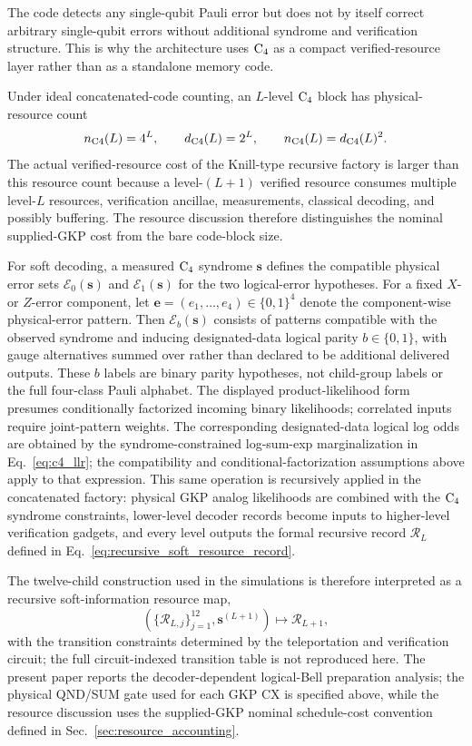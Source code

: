 \documentclass[aps,
prx,
superscriptaddress,
reprint,
longbibliography,
floatfix]{revtex4-2}
\begin{document}
The code detects any single-qubit Pauli error but does not by itself correct arbitrary single-qubit errors without additional syndrome and verification structure. This is why the architecture uses ${\rm C_4}$ as a compact verified-resource layer rather than as a standalone memory code.

Under ideal concatenated-code counting, an $L$-level ${\rm C_4}$ block has physical-resource count
\begin{equation}
 n_{\rm C4}(L)=4^L,
\qquad
 d_{\rm C4}(L)=2^L,
\qquad
 n_{\rm C4}(L)=d_{\rm C4}(L)^2 .
\end{equation}
The actual verified-resource cost of the Knill-type recursive factory is larger than this resource count because a level-$(L+1)$ verified resource consumes multiple level-$L$ resources, verification ancillae, measurements, classical decoding, and possibly buffering. The resource discussion therefore distinguishes the nominal supplied-GKP cost from the bare code-block size.

For soft decoding, a measured ${\rm C_4}$ syndrome $\bm s$ defines the compatible physical error sets $\mathcal E_{0}(\bm s)$ and $\mathcal E_1(\bm s)$ for the two logical-error hypotheses. For a fixed $X$- or $Z$-error component, let $\bm e=(e_1,\ldots,e_4)\in\{0,1\}^4$ denote the component-wise physical-error pattern. Then $\mathcal E_b(\bm s)$ consists of patterns compatible with the observed syndrome and inducing designated-data logical parity $b\in\{0,1\}$, with gauge alternatives summed over rather than declared to be additional delivered outputs. These $b$ labels are binary parity hypotheses, not child-group labels or the full four-class Pauli alphabet. The displayed product-likelihood form presumes conditionally factorized incoming binary likelihoods; correlated inputs require joint-pattern weights. The corresponding designated-data logical log odds are obtained by the syndrome-constrained log-sum-exp marginalization in Eq.~\eqref{eq:c4_llr}; the compatibility and conditional-factorization assumptions above apply to that expression.
This same operation is recursively applied in the concatenated factory: physical GKP analog likelihoods are combined with the ${\rm C_4}$ syndrome constraints, lower-level decoder records become inputs to higher-level verification gadgets, and every level outputs the formal recursive record $\mathcal R_L$ defined in Eq.~\eqref{eq:recursive_soft_resource_record}.

The twelve-child construction used in the simulations is therefore interpreted as a recursive soft-information resource map,
\begin{equation}
\left(\{\mathcal R_{L,j}\}_{j=1}^{12},\bm s^{(L+1)}\right)
\longmapsto
\mathcal R_{L+1},
\end{equation}
with the transition constraints determined by the teleportation and verification circuit; the full circuit-indexed transition table is not reproduced here. The present paper reports the decoder-dependent logical-Bell preparation analysis; the physical QND/SUM gate used for each GKP CX is specified above, while the resource discussion uses the supplied-GKP nominal schedule-cost convention defined in Sec.~\ref{sec:resource_accounting}.
\end{document}
